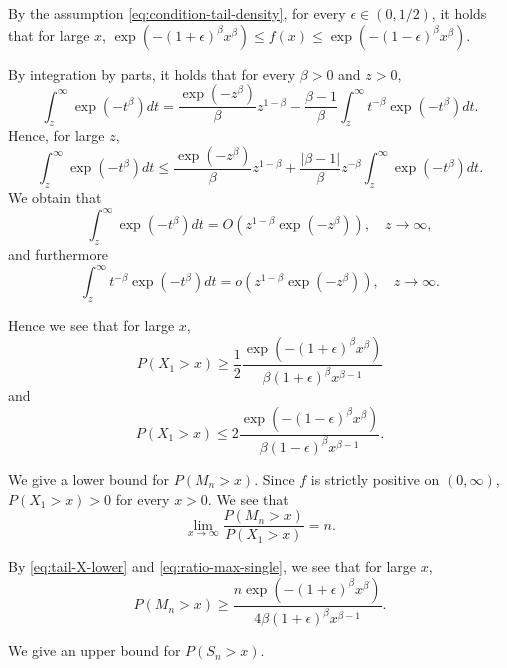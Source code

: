 \documentclass[a4paper, reqno, 11pt]{amsart}
\theoremstyle{definition}
\begin{document}
By the assumption \eqref{eq:condition-tail-density}, 
for every $\epsilon \in (0,1/2)$, it holds that for large $x$, 
$ \exp\left(- (1+\epsilon)^{\beta} x^{\beta} \right) \le f(x) \le \exp\left(- (1-\epsilon)^{\beta} x^{\beta} \right)$.

By integration by parts, 
it holds that for every $\beta > 0$ and $z > 0$, 
\begin{equation*}
\int_{z}^{\infty} \exp(-t^{\beta}) dt = \frac{\exp(-z^{\beta})}{\beta} z^{1 - \beta} - \frac{\beta - 1}{\beta} \int_{z}^{\infty} t^{-\beta} \exp(-t^{\beta})  dt. 
\end{equation*}
Hence, for large $z$, 
\[ \int_{z}^{\infty} \exp(-t^{\beta}) dt \le \frac{\exp(-z^{\beta})}{\beta} z^{1 - \beta} + \frac{|\beta - 1|}{\beta} z^{-\beta}  \int_{z}^{\infty} \exp(-t^{\beta})  dt. \]
We obtain that 
\[  \int_{z}^{\infty} \exp(-t^{\beta}) dt = O\left(  z^{1 - \beta} \exp(-z^{\beta}) \right), \quad z \to \infty, \]
and furthermore 
\[ \int_{z}^{\infty} t^{-\beta} \exp(-t^{\beta}) dt = o\left( z^{1 - \beta} \exp(-z^{\beta}) \right), \quad z \to \infty. \] 

Hence we see that for large $x$, 
\begin{equation}\label{eq:tail-X-lower}
P(X_1 > x)  \ge \frac{1}{2} \frac{\exp(- (1+\epsilon)^{\beta} x^{\beta})}{\beta (1+\epsilon)^{\beta} x^{\beta-1}}
\end{equation}
and
\begin{equation}\label{eq:tail-X-upper}
P(X_1 > x)  \le 2\frac{\exp(- (1-\epsilon)^{\beta} x^{\beta})}{\beta (1-\epsilon)^{\beta} x^{\beta-1}}.
\end{equation}


We give a lower bound for $P(M_n > x)$. 
Since $f$ is strictly positive on $(0,\infty)$, 
$P(X_1 > x) > 0$ for every $x > 0$. 
We see that 
\begin{equation}\label{eq:ratio-max-single} 
\lim_{x \to \infty} \frac{P(M_n > x)}{P(X_1 > x)} = n. 
\end{equation}



By \eqref{eq:tail-X-lower} and \eqref{eq:ratio-max-single}, 
we see that for large $x$, 
\begin{equation}\label{eq:max-infinity-lower}
P(M_n > x) \ge \frac{n \exp(- (1+\epsilon)^{\beta} x^{\beta})}{4\beta (1+\epsilon)^{\beta} x^{\beta-1}}.
\end{equation}



We give an upper bound for $P(S_n > x)$. 
\end{document}
